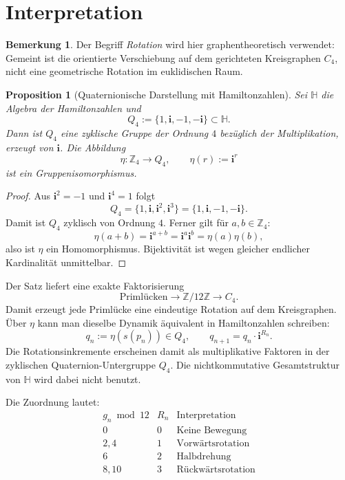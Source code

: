 \documentclass[11pt]{article}
\newtheorem{proposition}{Proposition}
\theoremstyle{definition}
\newtheorem{remark}{Bemerkung}
\begin{document}
\section{Interpretation}

\begin{remark}
Der Begriff \emph{Rotation} wird hier graphentheoretisch verwendet:
Gemeint ist die orientierte Verschiebung auf dem gerichteten Kreisgraphen $C_4$,
nicht eine geometrische Rotation im euklidischen Raum.
\end{remark}

\begin{proposition}[Quaternionische Darstellung mit Hamiltonzahlen]
Sei $\mathbb{H}$ die Algebra der Hamiltonzahlen und
\[
Q_4:=\{1,\mathbf{i},-1,-\mathbf{i}\}\subset\mathbb{H}.
\]
Dann ist $Q_4$ eine zyklische Gruppe der Ordnung $4$ bez\"uglich der Multiplikation, erzeugt von $\mathbf{i}$.
Die Abbildung
\[
\eta:\mathbb{Z}_4\to Q_4,\qquad \eta(r):=\mathbf{i}^r
\]
ist ein Gruppenisomorphismus.
\end{proposition}

\begin{proof}
Aus $\mathbf{i}^2=-1$ und $\mathbf{i}^4=1$ folgt
\[
Q_4=\{1,\mathbf{i},\mathbf{i}^2,\mathbf{i}^3\}=\{1,\mathbf{i},-1,-\mathbf{i}\}.
\]
Damit ist $Q_4$ zyklisch von Ordnung $4$. Ferner gilt f\"ur $a,b\in\mathbb{Z}_4$:
\[
\eta(a+b)=\mathbf{i}^{a+b}=\mathbf{i}^a\mathbf{i}^b=\eta(a)\eta(b),
\]
also ist $\eta$ ein Homomorphismus. Bijektivit\"at ist wegen gleicher endlicher
Kardinalit\"at unmittelbar.
\end{proof}

Der Satz liefert eine exakte Faktorisierung
\[
\text{Priml\"ucken}
\longrightarrow
\mathbb{Z}/12\mathbb{Z}
\longrightarrow
C_4.
\]
Damit erzeugt jede Priml\"ucke eine eindeutige Rotation auf dem Kreisgraphen.
\"Uber $\eta$ kann man dieselbe Dynamik \"aquivalent in Hamiltonzahlen schreiben:
\[
q_n:=\eta(s(p_n))\in Q_4,\qquad
q_{n+1}=q_n\cdot \mathbf{i}^{R_n}.
\]
Die Rotationsinkremente erscheinen damit als multiplikative Faktoren in der
zyklischen Quaternion-Untergruppe $Q_4$.
Die nichtkommutative Gesamtstruktur von $\mathbb{H}$ wird dabei nicht benutzt.

Die Zuordnung lautet:
\[
\begin{array}{c|c|c}
g_n\bmod 12 & R_n & \text{Interpretation}\\
\hline
0 & 0 & \text{Keine Bewegung}\\
2,4 & 1 & \text{Vorw\"artsrotation}\\
6 & 2 & \text{Halbdrehung}\\
8,10 & 3 & \text{R\"uckw\"artsrotation}
\end{array}
\]
\end{document}
